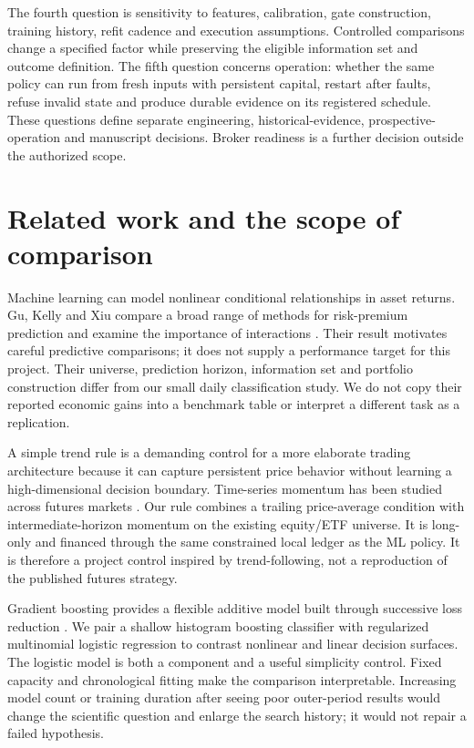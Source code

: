 \documentclass[11pt,a4paper]{article}
\begin{document}
The fourth question is sensitivity to features, calibration, gate construction, training history, refit cadence and execution assumptions. Controlled comparisons change a specified factor while preserving the eligible information set and outcome definition. The fifth question concerns operation: whether the same policy can run from fresh inputs with persistent capital, restart after faults, refuse invalid state and produce durable evidence on its registered schedule. These questions define separate engineering, historical-evidence, prospective-operation and manuscript decisions. Broker readiness is a further decision outside the authorized scope.


\section{Related work and the scope of comparison}\label{sec:section-02}

Machine learning can model nonlinear conditional relationships in asset returns. Gu, Kelly and Xiu compare a broad range of methods for risk-premium prediction and examine the importance of interactions \citep{gu2020}. Their result motivates careful predictive comparisons; it does not supply a performance target for this project. Their universe, prediction horizon, information set and portfolio construction differ from our small daily classification study. We do not copy their reported economic gains into a benchmark table or interpret a different task as a replication.

A simple trend rule is a demanding control for a more elaborate trading architecture because it can capture persistent price behavior without learning a high-dimensional decision boundary. Time-series momentum has been studied across futures markets \citep{momentum2012}. Our rule combines a trailing price-average condition with intermediate-horizon momentum on the existing equity/ETF universe. It is long-only and financed through the same constrained local ledger as the ML policy. It is therefore a project control inspired by trend-following, not a reproduction of the published futures strategy.

Gradient boosting provides a flexible additive model built through successive loss reduction \citep{friedman2001}. We pair a shallow histogram boosting classifier with regularized multinomial logistic regression to contrast nonlinear and linear decision surfaces. The logistic model is both a component and a useful simplicity control. Fixed capacity and chronological fitting make the comparison interpretable. Increasing model count or training duration after seeing poor outer-period results would change the scientific question and enlarge the search history; it would not repair a failed hypothesis.
\end{document}
